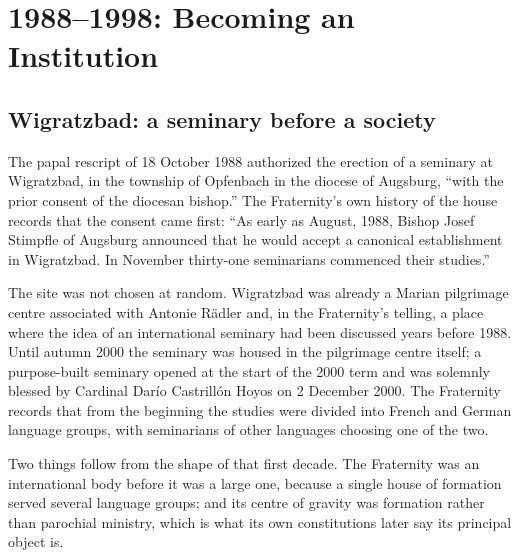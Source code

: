 \section{1988--1998: Becoming an Institution}

\subsection{Wigratzbad: a seminary before a society}

The papal rescript of 18 October 1988 authorized the erection of a
seminary at Wigratzbad, in the township of Opfenbach in the diocese of
Augsburg, ``with the prior consent of the diocesan bishop.'' The
Fraternity's own history of the house records that the consent came
first: ``As early as August, 1988, Bishop Josef Stimpfle of Augsburg
announced that he would accept a canonical establishment in Wigratzbad.
In November thirty-one seminarians commenced their studies.''

The site was not chosen at random. Wigratzbad was already a Marian
pilgrimage centre associated with Antonie Rädler and, in the Fraternity's
telling, a place where the idea of an international seminary had been
discussed years before 1988. Until autumn 2000 the seminary was housed in
the pilgrimage centre itself; a purpose-built seminary opened at the
start of the 2000 term and was solemnly blessed by Cardinal Darío
Castrillón Hoyos on 2 December 2000. The Fraternity records that from the
beginning the studies were divided into French and German language
groups, with seminarians of other languages choosing one of the
two.

Two things follow from the shape of that first decade. The Fraternity was
an international body before it was a large one, because a single house
of formation served several language groups; and its centre of gravity
was formation rather than parochial ministry, which is what its own
constitutions later say its principal object is.

